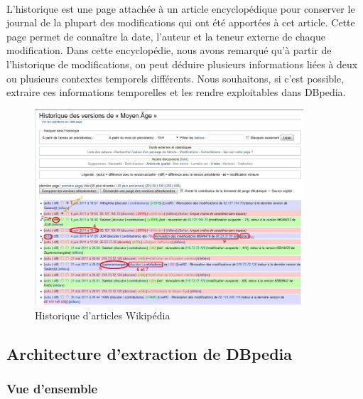 \documentclass[12pt,a4	]{report}
\begin{document}
\paragraph{}
L'historique est une page attachée à un article encyclopédique pour conserver le journal de la plupart des modifications qui ont été apportées à cet article. Cette page permet de connaître la date, l'auteur et la teneur externe de chaque modification.
Dans cette encyclopédie, nous avons remarqué qu'à partir de l'historique de modifications, on peut déduire plusieurs informations liées à deux ou plusieurs contextes temporels différents.
Nous souhaitons, si c’est possible, extraire ces informations temporelles et les rendre exploitables dans DBpedia.
\begin{figure}[H]
\centering
\includegraphics[width=10cm]{Historique_articles.jpg}
\caption{Historique d'articles Wikipédia}
\end{figure}
\newpage

\subsection*{Architecture d'extraction de DBpedia}
\subsubsection*{Vue d'ensemble}
\end{document}
